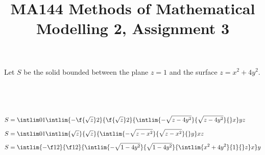 \documentclass[a4paper]{article}
\title{MA144 Methods of Mathematical Modelling 2, Assignment 3}
\begin{document}
\maketitle

\setlength{\parindent}{0em}
\setlength{\parskip}{1em}


Let $S$ be the solid bounded between the plane $z=1$ and the surface $z = x^2 + 4y^2$.

\subsection{~}

\begin{align*}
S &= \intlim 01 {\intlim {-\f{\sqrt z}2}{\f{\sqrt z}2} {\intlim {-\sqrt{z - 4y^2}}{\sqrt{z - 4y^2}} {} x} y} z\\[1ex]
S &= \intlim 01 {\intlim {\sqrt z}{\sqrt z} {\intlim {-\sqrt{z - x^2}}{\sqrt{z - x^2}} {} y} x} z\\[1ex]
S &= \intlim {-\f12}{\f12} {\intlim {-\sqrt{1 - 4y^2}}{\sqrt{1 - 4y^2}} {\intlim {x^2 + 4y^2}{1} {} z} x} y\\[1ex]
\end{align*}

\subsection{~}
\end{document}
